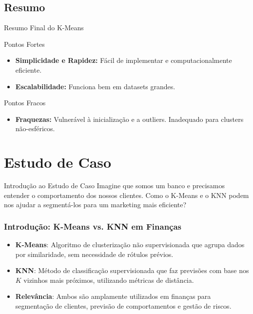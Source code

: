 \documentclass{beamer}
\begin{document}
\subsection{Resumo}
\begin{frame}{Resumo Final do K-Means}
    
    \begin{block}{Pontos Fortes}
        \begin{itemize}
            \item \textbf{Simplicidade e Rapidez:} Fácil de implementar e computacionalmente eficiente.
            \item \textbf{Escalabilidade:} Funciona bem em datasets grandes.
        \end{itemize}
    \end{block}
    
    \begin{block}{Pontos Fracos}
        \begin{itemize}
        \item \textbf{Fraquezas:} Vulnerável à inicialização e a outliers. Inadequado para clusters não-esféricos.
    \end{itemize}
    \end{block}
\end{frame}

\section{Estudo de Caso}
\begin{frame}{Introdução ao Estudo de Caso}
    Imagine que somos um banco e precisamos entender o comportamento dos nossos clientes. Como o K-Means e o KNN podem nos ajudar a segmentá-los para um marketing mais eficiente?
\end{frame}

\begin{frame}
    \frametitle{Introdução: K-Means vs. KNN em Finanças}
\begin{itemize}
        \item \textbf{K-Means}: Algoritmo de clusterização não supervisionada que agrupa dados por similaridade, sem necessidade de rótulos prévios.
        \item \textbf{KNN}: Método de classificação supervisionada que faz previsões com base nos \( K \) vizinhos mais próximos, utilizando métricas de distância.
        \item \textbf{Relevância}: Ambos são amplamente utilizados em finanças para segmentação de clientes, previsão de comportamentos e gestão de riscos.
    \end{itemize}
\end{frame}
\end{document}
